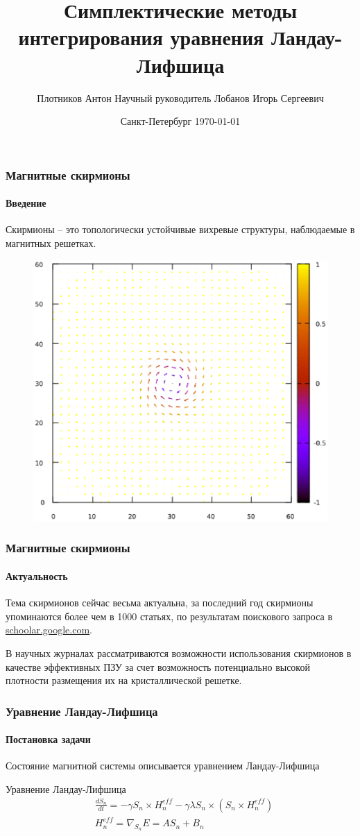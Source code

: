 \documentclass[t]{beamer}
\title[Симп. мет. инт. ур-я Ландау-Лифшица]{Симплектические методы интегрирования\linebreak
уравнения Ландау-Лифшица}
\author[Плотников Антон]{Плотников Антон \linebreak\small
Научный руководитель Лобанов Игорь Сергеевич}
\institute{Кафедра высшей математики}
\date{Санкт-Петербург \today}
\begin{document}
\frame[plain]{\titlepage}

\begin{frame}
    \frametitle{Магнитные скирмионы}
    \framesubtitle{Введение}
    Скирмионы -- это топологически устойчивые вихревые структуры, наблюдаемые в
    магнитных решетках.

    \begin{figure}
        \centering
        \includegraphics[scale=0.3]{../img/simple_skyrmion_1}
    \end{figure}
\end{frame}

\begin{frame}
    \frametitle{Магнитные скирмионы}
    \framesubtitle{Актуальность}
    Тема скирмионов сейчас весьма актуальна, за последний год скирмионы
    упоминаются более чем в 1000 статьях, по результатам поискового запроса в
    \url{schoolar.google.com}.

    В научных журналах рассматриваются возможности использования скирмионов в
    качестве эффективных ПЗУ за счет возможность потенциально высокой плотности
    размещения их на кристаллической решетке.
\end{frame}

\begin{frame}
    \frametitle{Уравнение Ландау-Лифшица}
    \framesubtitle{Постановка задачи}

    Состояние магнитной системы описывается уравнением Ландау-Лифшица

    \begin{block}{Уравнение Ландау-Лифшица}
        \begin{align*}
            &\frac{dS_n}{dt} = -\gamma S_n \times H^{eff}_n - \gamma\lambda S_n \times
            \left(S_n\times H^{eff}_n \right)
            \\
            &H^{eff}_n = \nabla_{S_n}E = AS_n + B_n
        \end{align*}
    \end{block}
\end{frame}
\end{document}
